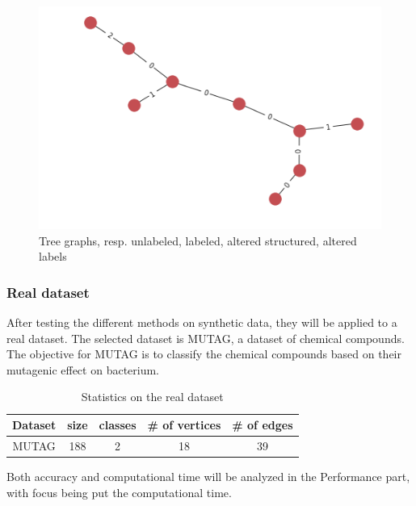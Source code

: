 \documentclass{article}
\theoremstyle{definition}
\begin{document}
\begin{figure}[!htb]
\begin{multicols}{4}
		\includegraphics[width=\linewidth]{data/generated-graphs/tree_altered_labels.png}\par
	\end{multicols}
	\caption{Tree graphs, resp. unlabeled, labeled, altered structured, altered labels}
\end{figure}
\subsubsection{Real dataset}
After testing the different methods on synthetic data, they will be applied to a real dataset. The selected dataset is MUTAG, a dataset of chemical compounds. The objective for MUTAG is to classify the chemical compounds based on their mutagenic effect on bacterium.
\begin{table}[!htb]
	\begin{center}
		\begin{tabular}{|c|c|c|c|c|}
			\hline
			Dataset & size & classes & \# of vertices & \# of edges\\
			\hline
			MUTAG & 188 & 2 & 18 & 39\\
			\hline
		\end{tabular}
	\end{center}
	\caption {Statistics on the real dataset}
	\label{tab:stats_real}
\end{table} Both accuracy and computational time will be analyzed in the Performance part, with focus being put the computational time.
\end{document}
